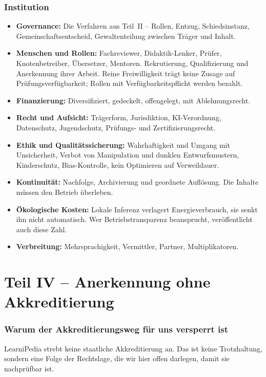 \documentclass[11pt,a4paper]{article}
\newcommand{\teilnummerierung}[1]{%
    \setcounter{section}{0}%
    \renewcommand{\thesection}{#1.\arabic{section}}%
    \renewcommand{\theHsection}{#1.\arabic{section}}%
}
\begin{document}
\section{Institution}
\begin{itemize}[label=--]
    \item \textbf{Governance:} Die Verfahren aus Teil~II -- Rollen, Entzug, Schiedsinstanz, Gemeinschaftsentscheid, Gewaltenteilung zwischen Träger und Inhalt.
    \item \textbf{Menschen und Rollen:} Fachreviewer, Didaktik-Lenker, Prüfer, Knotenbetreiber, Übersetzer, Mentoren. Rekrutierung, Qualifizierung und Anerkennung ihrer Arbeit. Reine Freiwilligkeit trägt keine Zusage auf Prüfungsverfügbarkeit; Rollen mit Verfügbarkeitspflicht werden bezahlt.
    \item \textbf{Finanzierung:} Diversifiziert, gedeckelt, offengelegt, mit Ablehnungsrecht.
    \item \textbf{Recht und Aufsicht:} Trägerform, Jurisdiktion, KI-Verordnung, Datenschutz, Jugendschutz, Prüfungs- und Zertifizierungsrecht.
    \item \textbf{Ethik und Qualitätssicherung:} Wahrhaftigkeit und Umgang mit Unsicherheit, Verbot von Manipulation und dunklen Entwurfsmustern, Kinderschutz, Bias-Kontrolle, kein Optimieren auf Verweildauer.
    \item \textbf{Kontinuität:} Nachfolge, Archivierung und geordnete Auflösung. Die Inhalte müssen den Betrieb überleben.
    \item \textbf{Ökologische Kosten:} Lokale Inferenz verlagert Energieverbrauch, sie senkt ihn nicht automatisch. Wer Betriebstransparenz beansprucht, veröffentlicht auch diese Zahl.
    \item \textbf{Verbreitung:} Mehrsprachigkeit, Vermittler, Partner, Multiplikatoren.
\end{itemize}

\part*{Teil IV -- Anerkennung ohne Akkreditierung}
\teilnummerierung{IV}

\section{Warum der Akkreditierungsweg für uns versperrt ist}
LearniPedia strebt keine staatliche Akkreditierung an. Das ist keine Trotzhaltung, sondern eine Folge der Rechtslage, die wir hier offen darlegen, damit sie nachprüfbar ist.
\end{document}
